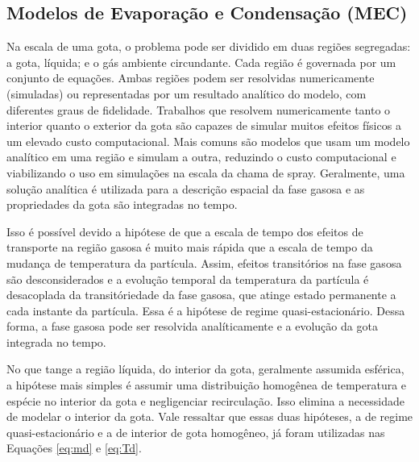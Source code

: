 \subsection{Modelos de Evaporação e Condensação (MEC)} \label{sec:MEC}


Na escala de uma gota, o problema pode ser dividido em duas regiões segregadas: a gota, líquida; e o gás ambiente circundante. 
Cada região é governada por um conjunto de equações.
Ambas regiões podem ser resolvidas numericamente (simuladas) ou representadas por um resultado analítico do modelo, com diferentes graus de fidelidade.
Trabalhos que resolvem numericamente tanto o interior quanto o exterior da gota são capazes de simular muitos efeitos físicos a um elevado custo computacional. %
Mais comuns são modelos que usam um modelo analítico em uma região e simulam a outra, reduzindo o custo computacional e viabilizando o uso em simulações na escala da chama de spray.
Geralmente, uma solução analítica é utilizada para a descrição espacial da fase gasosa e as propriedades da gota são integradas no tempo. 

Isso é possível devido a hipótese de que a escala de tempo dos efeitos de transporte na região gasosa é muito mais rápida que a escala de tempo da mudança de temperatura da partícula.
Assim, efeitos transitórios na fase gasosa são desconsiderados e a evolução temporal da temperatura da partícula é desacoplada da transitóriedade da fase gasosa, que atinge estado permanente a cada instante da partícula.
Essa é a hipótese de regime quasi-estacionário.
Dessa forma, a fase gasosa pode ser resolvida analíticamente e a evolução da gota integrada no tempo.


No que tange a região líquida, do interior da gota, geralmente assumida esférica, a hipótese mais simples é assumir uma distribuição homogênea de temperatura e espécie no interior da gota e negligenciar recirculação.
Isso elimina a necessidade de modelar o interior da gota.
Vale ressaltar que essas duas hipóteses, a de regime quasi-estacionário e a de interior de gota homogêneo, já foram utilizadas nas Equações \eqref{eq:md} e \eqref{eq:Td}.

